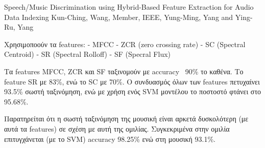 Speech/Music Discrimination using Hybrid-Based Feature Extraction for Audio Data Indexing
Kun-Ching, Wang, Member, IEEE, Yung-Ming, Yang and Ying-Ru, Yang

Χρησιμοποούν τα features:
- ΜFCC
- ZCR (zero crossing rate)
- SC (Spectral Centroid)
- SR (Spectral Rolloff)
- SF (Specral Flux)

Τα features ΜFCC, ZCR και SF ταξινομούν με accuracy ~90\% το καθένα. Το feature SR με 83\%, ενώ το SC με 70\%.
Ο συνδυασμός όλων των features πετυχαίνει 93.5\% σωστή ταξινόμηση, ενώ με χρήση ενός SVM μοντέλου το ποστοστό φτάνει στο 95.68\%.

Παρατηρείται ότι η σωστή ταξινόμηση της μουσική είναι αρκετά δυσκολότερη (με αυτά τα features) σε σχέση με αυτή της ομιλίας. Συγκεκριμένα στην ομιλία επιτυγχάνεται (με το SVM) accuracy 98.25\% ενώ στη μουσική 93.1\%.